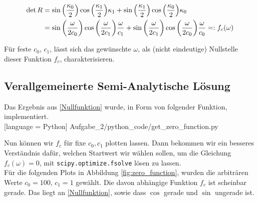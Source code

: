 \begin{align} \label{Nullfunktion}
  \nonumber
  \det{R}
  & = \sin{\left(\frac{{\kappa}_{0}}{2} \right)} \cos{\left(\frac{{\kappa}_{1}}{2} \right)} {\kappa}_{1} + \sin{\left(\frac{{\kappa}_{1}}{2} \right)} \cos{\left(\frac{{\kappa}_{0}}{2} \right)} {\kappa}_{0} \\
  & = \sin{{\left ( \frac{\omega}{2 c_0} \right )}}
      \cos{{\left ( \frac{\omega}{2 c_1} \right )}}
      \frac{\omega}{c_1} +
      \sin{{\left ( \frac{\omega}{2 c_1} \right )}}
      \cos{{\left ( \frac{\omega}{2 c_0} \right )}}
      \frac{\omega}{c_0} =: f_c(\omega)
\end{align}

Für feste $c_0$, $c_1$, lässt sich das gewünschte $\omega$, als (nicht eindeutige) Nullstelle dieser Funktion $f_c$, charakterisieren.

\subsection{Verallgemeinerte Semi-Analytische Lösung}

Das Ergebnis aus \eqref{Nullfunktion} wurde, in Form von folgender Funktion, implementiert. \\


[language = Python]
{Aufgabe_2/python_code/get_zero_function.py}
\vspace{10pt}

Nun können wir $f_c$ für fixe $c_0, c_1$ plotten lassen. Dann bekommen wir ein besseres Verständnis dafür, welchen Startwert wir wählen sollen, um die Gleichung $f_c(\omega) = 0$, mit \verb|scipy.optimize.fsolve| lösen zu lassen. \\

Für die folgenden Plots in Abbildung \ref{fig:zero_function}, wurden die arbiträren Werte $c_0 = 100$, $c_1 = 1$ gewählt. Die davon abhängige Funktion $f_c$ ist scheinbar gerade. Das liegt an \eqref{Nullfunktion}, sowie dass $\cos$ gerade und $\sin$ ungerade ist.


